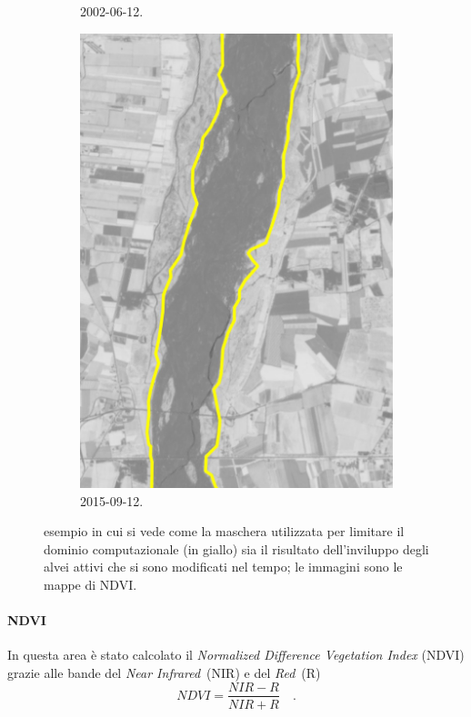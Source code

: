 \begin{figure}
\begin{subfigure}[b]{0.4\textwidth}
		\caption{\AST{} 2002-06-12.}
	\end{subfigure}
	\qquad
	\begin{subfigure}[b]{0.4\textwidth}
		\includegraphics[width=\textwidth]{files/esempio_mask_2015_09_12.jpeg}
		\caption{\Se{} 2015-09-12.}
	\end{subfigure}
	\caption[definizione della maschera per limitare il dominio computazionale]
		{esempio in cui si vede come la maschera utilizzata per limitare il dominio computazionale (in giallo) sia il risultato dell'inviluppo degli alvei attivi che si sono modificati nel tempo; le immagini sono le mappe di NDVI.}
	\label{fig:esempio-maschera}
\end{figure}
%
%
\paragraph{NDVI} 
In questa area è stato calcolato il \emph{\foreignlanguage{english}{Normalized Difference Vegetation Index}} (NDVI) grazie alle bande del \emph{Near Infrared}~(NIR) e del \emph{Red}~(R)
%
\begin{equation}
	NDVI = \frac{NIR - R}{NIR + R} \quad .
	\label{eq:ndvi}
\end{equation}
%
%

